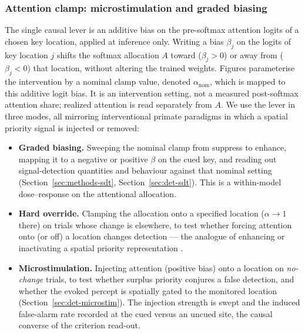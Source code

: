 \subsubsection{Attention clamp: microstimulation and graded biasing}
\label{sec:methods-clamp}

The single causal lever is an additive bias on the pre-softmax attention
logits of a chosen key location, applied at inference only. Writing a bias
$\beta_j$ on the logits of key location $j$ shifts the softmax allocation
$A$ toward ($\beta_j > 0$) or away from ($\beta_j < 0$) that location,
without altering the trained weights. Figures parameterise the intervention by a
nominal clamp value, denoted $\alpha_{\mathrm{nom}}$, which is mapped to this
additive logit bias. It is an intervention setting, not a measured post-softmax
attention share; realized attention is read separately from $A$. We use the lever in three modes, all
mirroring interventional primate paradigms in which a spatial priority
signal is injected or removed:
\begin{itemize}
\item \textbf{Graded biasing.} Sweeping the nominal clamp from suppress to
  enhance, mapping it to a negative or positive $\beta$ on the cued key, and
  reading out signal-detection quantities and behaviour against that nominal
  setting (Section~\ref{sec:methods-sdt},
  Section~\ref{sec:det-sdt}). This is a within-model dose--response on the
  attentional allocation.
\item \textbf{Hard override.} Clamping the allocation onto a specified
  location ($\alpha \to 1$ there) on trials whose change is elsewhere, to
  test whether forcing attention onto (or off) a location changes
  detection --- the analogue of enhancing or inactivating a spatial
  priority representation \cite{MullerFindlay1987}.
\item \textbf{Microstimulation.} Injecting attention (positive bias) onto a
  location on \emph{no-change} trials, to test whether surplus priority
  conjures a false detection, and whether the evoked percept is spatially
  gated to the monitored location (Section~\ref{sec:det-microstim}). The
  injection strength is swept and the induced false-alarm rate recorded at
  the cued versus an uncued site, the causal converse of the criterion
  read-out.
\end{itemize}

